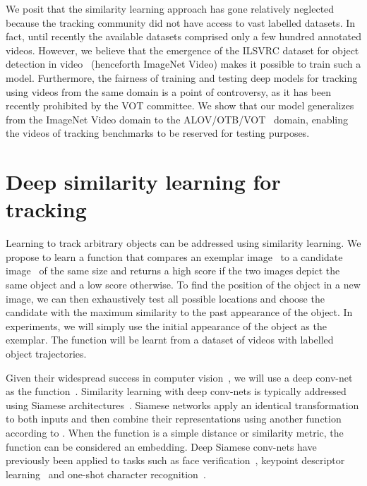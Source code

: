 \documentclass[runningheads]{llncs}
\begin{document}
We posit that the similarity learning approach has gone relatively neglected because the tracking community did not have access to vast labelled datasets.
In fact, until recently the available datasets comprised only a few hundred annotated videos.
However, we believe that the emergence of the ILSVRC dataset for object detection in video~\cite{ILSVRC15} (henceforth ImageNet Video) makes it possible to train such a model.
Furthermore, the fairness of training and testing deep models for tracking using videos from the same domain is a point of controversy, as it has been recently prohibited by the VOT committee.
We show that our model generalizes from the ImageNet Video domain to the ALOV/OTB/VOT~\cite{smeulders2014visual,WuLimYang13,kristan2015visual} domain, enabling the videos of tracking benchmarks to be reserved for testing purposes.

 
\section{Deep similarity learning for tracking}
\label{sec:methodology}
Learning to track arbitrary objects can be addressed using similarity learning.
We propose to learn a function  that compares an exemplar image~ to a candidate image~ of the same size and returns a high score if the two images depict the same object and a low score otherwise.
To find the position of the object in a new image, we can then exhaustively test all possible locations and choose the candidate with the maximum similarity to the past appearance of the object.
In experiments, we will simply use the initial appearance of the object as the exemplar.
The function  will be learnt from a dataset of videos with labelled object trajectories.

Given their widespread success in computer vision~\cite{razavian2014cnn,parkhi2015deep,dosovitskiy2015flownet,krizhevsky2012imagenet}, we will use a deep conv-net as the function~.
Similarity learning with deep conv-nets is typically addressed using Siamese architectures~\cite{bromley1993signature,taigman2014deepface,zagoruyko2015learning}.
Siamese networks apply an identical transformation  to both inputs and then combine their representations using another function  according to .
When the function  is a simple distance or similarity metric, the function  can be considered an embedding.
Deep Siamese conv-nets have previously been applied to tasks such as face verification~\cite{taigman2014deepface,schroff2015facenet,parkhi2015deep}, keypoint descriptor learning~\cite{zagoruyko2015learning,simo2015discriminative} and one-shot character recognition~\cite{koch2015siamese}.
\end{document}
